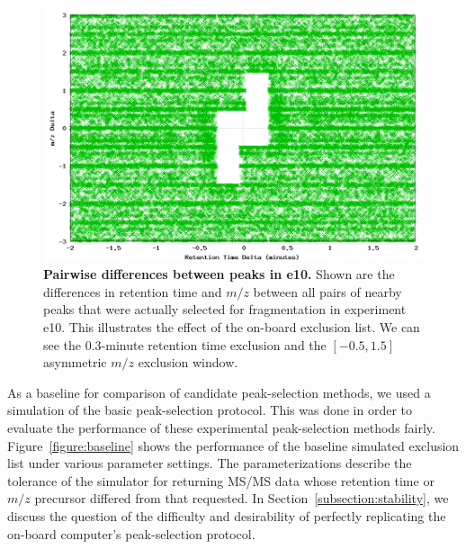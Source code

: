 \documentclass[12pt,twoside,openright]{report}
\begin{document}
\begin{figure}
\centering
\includegraphics[width=6.0in]{margins.png}
\caption[Pairwise differences between peaks in e10]{{\bf Pairwise differences
    between peaks in e10.} Shown are the differences in retention time and $m/z$
  between all pairs of nearby peaks that were actually selected for
  fragmentation in experiment e10. This illustrates the effect of the on-board
  exclusion list. We can see the $0.3$-minute retention time exclusion and the
  $[-0.5, 1.5]$ asymmetric $m/z$ exclusion window.
  \label{figure:deltas}}
\end{figure}

As a baseline for comparison of candidate peak-selection methods, we used a
simulation of the basic peak-selection protocol. This was done in order to
evaluate the performance of these experimental peak-selection methods
fairly. Figure~\ref{figure:baseline} shows the performance of the baseline
simulated exclusion list under various parameter settings.  The
parameterizations describe the tolerance of the simulator for returning MS/MS
data whose retention time or $m/z$ precursor differed from that requested.  In
Section~\ref{subsection:stability}, we discuss the question of the difficulty
and desirability of perfectly replicating the on-board computer's
peak-selection protocol.
\end{document}

